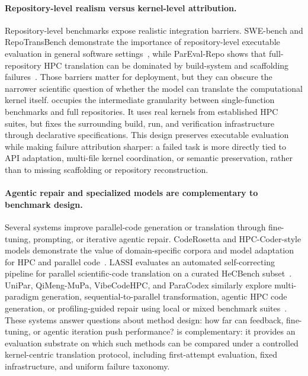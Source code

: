 \paragraph{Repository-level realism versus kernel-level attribution.}
Repository-level benchmarks expose realistic integration barriers. SWE-bench and RepoTransBench demonstrate the importance of repository-level executable evaluation in general software settings~\cite{SWEbench2024,Wang2026RepoTransBench}, while ParEval-Repo shows that full-repository HPC translation can be dominated by build-system and scaffolding failures~\cite{ParEvalRepo2025}. Those barriers matter for deployment, but they can obscure the narrower scientific question of whether the model can translate the computational kernel itself. \parbench{} occupies the intermediate granularity between single-function benchmarks and full repositories. It uses real kernels from established HPC suites, but fixes the surrounding build, run, and verification infrastructure through declarative specifications. This design preserves executable evaluation while making failure attribution sharper: a failed task is more directly tied to API adaptation, multi-file kernel coordination, or semantic preservation, rather than to missing scaffolding or repository reconstruction.

\paragraph{Agentic repair and specialized models are complementary to benchmark design.}
Several systems improve parallel-code generation or translation through fine-tuning, prompting, or iterative agentic repair. CodeRosetta and HPC-Coder-style models demonstrate the value of domain-specific corpora and model adaptation for HPC and parallel code~\cite{CodeRosetta2024,HPCCoder2024,HPCCoderV2}. LASSI evaluates an automated self-correcting pipeline for parallel scientific-code translation on a curated HeCBench subset~\cite{LASSI2024}. UniPar, QiMeng-MuPa, VibeCodeHPC, and ParaCodex similarly explore multi-paradigm generation, sequential-to-parallel transformation, agentic HPC code generation, or profiling-guided repair using local or mixed benchmark suites~\cite{UniPar2025,QiMengMuPa2025,VibeCodeHPC2026,ParaCodex2026}. These systems answer questions about method design: how far can feedback, fine-tuning, or agentic iteration push performance? \parbench{} is complementary: it provides an evaluation substrate on which such methods can be compared under a controlled kernel-centric translation protocol, including first-attempt evaluation, fixed infrastructure, and uniform failure taxonomy.

